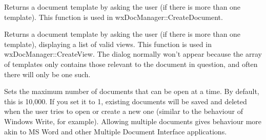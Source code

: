 

Returns a document template by asking the user (if there is more than one template).
This function is used in wxDocManager::CreateDocument.



Returns a document template by asking the user (if there is more than one template),
displaying a list of valid views. This function is used in wxDocManager::CreateView.
The dialog normally won't appear because the array of templates only contains
those relevant to the document in question, and often there will only be one such.



Sets the maximum number of documents that can be open at a time. By default, this
is 10,000. If you set it to 1, existing documents will be saved and deleted
when the user tries to open or create a new one (similar to the behaviour
of Windows Write, for example). Allowing multiple documents gives behaviour
more akin to MS Word and other Multiple Document Interface applications.




